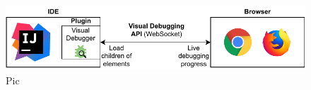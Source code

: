 \documentclass[sigconf]{acmart}
\begin{document}
\begin{figure}[ht]
  \centering
  \includegraphics[width=\linewidth]{images/VD-architecture.pdf}
  \caption{Pic}
\end{figure}

\cite{krauterVisualDebuggerTool2022}
\cite{krauterBehavioralConsistencyMultimodeling2023}




\end{document}
